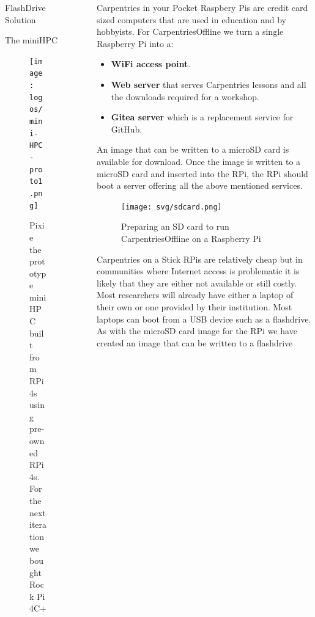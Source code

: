 \documentclass[final,20pt]{beamer}
\newlength{\sepwidth}
\newlength{\colwidth}
\newcommand{\separatorcolumn}{\begin{column}{\sepwidth}\end{column}}
\begin{document}
\begin{frame}[t]
\begin{columns}[t]
\begin{column}{\colwidth}
\begin{block}{FlashDrive Solution}
				\end{block}
				\begin{block}{The miniHPC }	
					\begin{figure}
						\begin{center}
							\texttt{[image: logos/mini-HPC-proto1.png]}
							\caption{Pixie the prototype miniHPC built from RPi4s using pre-owned RPi 4s. 
								For the next iteration we bought Rock Pi 4C+}
						\end{center}
					\end{figure}
				\end{block}
			\end{column}
			\separatorcolumn
			\begin{column}{\colwidth}
				\begin{alertblock}{Carpentries in your Pocket}
					Raspbery Pis are credit card sized computers that are used in education and by hobbyists.
					For CarpentriesOffline we turn a single Raspberry Pi into a:
					\begin{itemize}
					\item \textbf{WiFi access point}.
					\item \textbf{Web server} that serves Carpentries lessons and all the downloads required for 
					a workshop.
					\item \textbf{Gitea server} which is a replacement service for GitHub.
					\end{itemize}
					An image that can be written to a microSD card is available 
					for download. Once the image is written to a microSD card and inserted into the RPi, 
					the RPi should boot a server offering all the above mentioned services.
					\begin{center}
						\begin{figure}
							\texttt{[image: svg/sdcard.png]}
							\caption{Preparing an SD card to run CarpentriesOffline on a Raspberry Pi}
						\end{figure}
					\end{center}
				\end{alertblock}		
				\begin{alertblock}{Carpentries on a Stick}
					RPis are relatively cheap but in communities where Internet access is problematic it is likely that they are either not available or still 
					costly. Most researchers will already have either a laptop of their own or one provided by their institution. Most laptops can boot from 
					a USB device such as a flashdrive. As with the microSD card image for the RPi we have created an image that can be written to a flashdrive 

\end{alertblock}
\end{column}
\end{columns}
\end{frame}
\end{document}
